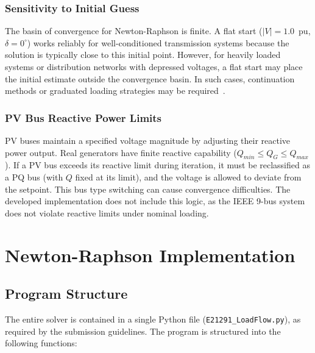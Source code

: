 \documentclass[12pt, a4paper]{article}
\begin{document}
\subsubsection{Sensitivity to Initial Guess}
The basin of convergence for Newton-Raphson is finite. A flat start ($|V| = 1.0$~pu, $\delta = 0^{\circ}$) works reliably for well-conditioned transmission systems because the solution is typically close to this initial point. However, for heavily loaded systems or distribution networks with depressed voltages, a flat start may place the initial estimate outside the convergence basin. In such cases, continuation methods or graduated loading strategies may be required~\cite{grainger}.

\subsubsection{PV Bus Reactive Power Limits}
PV buses maintain a specified voltage magnitude by adjusting their reactive power output. Real generators have finite reactive capability ($Q_{min} \leq Q_G \leq Q_{max}$). If a PV bus exceeds its reactive limit during iteration, it must be reclassified as a PQ bus (with $Q$ fixed at its limit), and the voltage is allowed to deviate from the setpoint. This bus type switching can cause convergence difficulties. The developed implementation does not include this logic, as the IEEE 9-bus system does not violate reactive limits under nominal loading.


\newpage
\section{Newton-Raphson Implementation}

\subsection{Program Structure}
The entire solver is contained in a single Python file (\texttt{E21291\_LoadFlow.py}), as required by the submission guidelines. The program is structured into the following functions:
\end{document}
